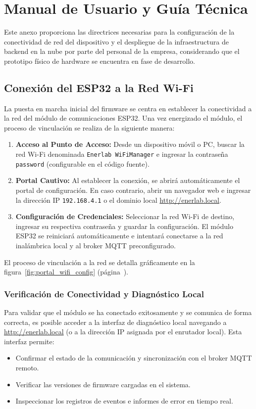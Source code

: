 \documentclass[12pt, a4paper]{article} %
\begin{document}
\clearpage
\section{Manual de Usuario y Guía Técnica}

Este anexo proporciona las directrices necesarias para la configuración de la conectividad de red del dispositivo y el despliegue de la infraestructura de backend en la nube por parte del personal de la empresa, considerando que el prototipo físico de hardware se encuentra en fase de desarrollo.

\subsection{Conexión del ESP32 a la Red Wi-Fi}

La puesta en marcha inicial del firmware se centra en establecer la conectividad a la red del módulo de comunicaciones ESP32. Una vez energizado el módulo, el proceso de vinculación se realiza de la siguiente manera:

\begin{enumerate}
  \item \textbf{Acceso al Punto de Acceso:} Desde un dispositivo móvil o PC, buscar la red Wi-Fi denominada \texttt{Enerlab WiFiManager} e ingresar la contraseña \texttt{password} (configurable en el código fuente).
  \item \textbf{Portal Cautivo:} Al establecer la conexión, se abrirá automáticamente el portal de configuración. En caso contrario, abrir un navegador web e ingresar la dirección IP \texttt{192.168.4.1} o el dominio local \url{http://enerlab.local}.
  \item \textbf{Configuración de Credenciales:} Seleccionar la red Wi-Fi de destino, ingresar su respectiva contraseña y guardar la configuración. El módulo ESP32 se reiniciará automáticamente e intentará conectarse a la red inalámbrica local y al broker MQTT preconfigurado.
\end{enumerate}

El proceso de vinculación a la red se detalla gráficamente en la figura~\ref{fig:portal_wifi_config} (página~\pageref{fig:portal_wifi_config}).

\subsubsection{Verificación de Conectividad y Diagnóstico Local}

Para validar que el módulo se ha conectado exitosamente y se comunica de forma correcta, es posible acceder a la interfaz de diagnóstico local navegando a \url{http://enerlab.local} (o a la dirección IP asignada por el enrutador local). Esta interfaz permite:
\begin{itemize}
  \item Confirmar el estado de la comunicación y sincronización con el broker MQTT remoto.
  \item Verificar las versiones de firmware cargadas en el sistema.
  \item Inspeccionar los registros de eventos e informes de error en tiempo real.
\end{itemize}
\end{document}

